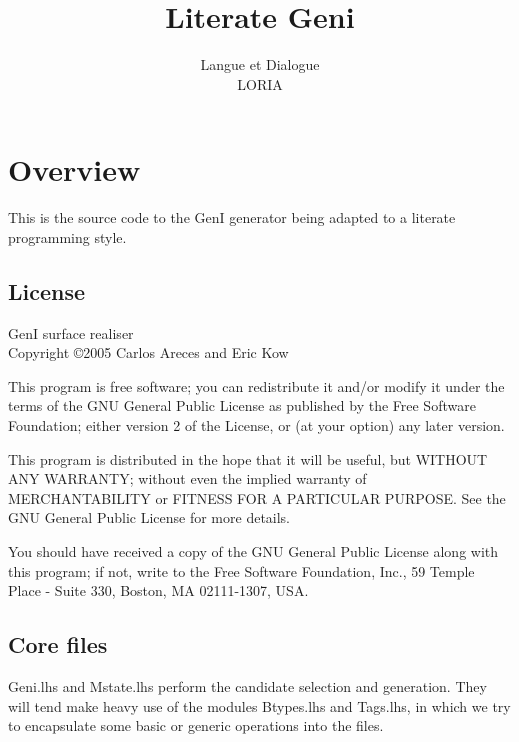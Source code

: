 \documentclass[a4paper,11pt]{report}
\begin{document}
\title{Literate Geni}
\author{Langue et Dialogue\\LORIA}

\maketitle
\tableofcontents


\chapter{Overview}

This is the source code to the GenI generator being adapted to a
literate programming style.  

\section{License}

GenI surface realiser\\
Copyright \copyright 2005 Carlos Areces and Eric Kow

\bigskip

This program is free software; you can redistribute it and/or
modify it under the terms of the GNU General Public License
as published by the Free Software Foundation; either version 2
of the License, or (at your option) any later version.

\bigskip

This program is distributed in the hope that it will be useful,
but WITHOUT ANY WARRANTY; without even the implied warranty of
MERCHANTABILITY or FITNESS FOR A PARTICULAR PURPOSE.  See the
GNU General Public License for more details.

\bigskip

You should have received a copy of the GNU General Public License
along with this program; if not, write to the Free Software
Foundation, Inc., 59 Temple Place - Suite 330, Boston, MA  02111-1307, USA.

\section{Core files}

Geni.lhs and Mstate.lhs perform the candidate selection and generation.
They will tend make heavy use of the modules Btypes.lhs and Tags.lhs, in
which we try to encapsulate some basic or generic operations into the
files.
\end{document}
